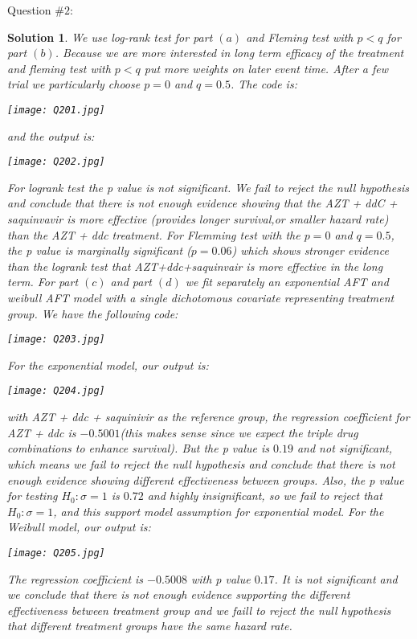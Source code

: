 \documentclass[11pt]{article}
\newtheorem{sol}{Solution}
\begin{document}
Question $\#2$:
\begin{sol}
	We use log-rank test for part $(a)$ and Fleming test with $p <q$ for part $(b)$. Because we are more interested in long term efficacy of the treatment and fleming test with $p <q$ put more weights on later event time. After a few trial we particularly choose $p = 0$ and $q = 0.5$. The code is:
	\begin{center}
		\texttt{[image: Q201.jpg]}
	\end{center}
	and the output is:
	\begin{center}
		\texttt{[image: Q202.jpg]}
	\end{center}
	For logrank test the p value is not significant. We fail to reject the null hypothesis and conclude that there is not enough evidence showing that the AZT + ddC + saquinvavir is more effective (provides longer survival,or smaller hazard rate) than the AZT + ddc treatment.\vskip 2mm
	For Flemming test with the $p = 0$ and $q = 0.5$, the p value is marginally significant ($p = 0.06$) which shows stronger evidence than the logrank test that AZT+ddc+saquinvair is more effective in the long term.\vskip 2mm
	For part $(c)$ and part $(d)$ we fit separately an exponential AFT and weibull AFT model with a single dichotomous covariate representing treatment group. We have the following code:
	\begin{center}
		\texttt{[image: Q203.jpg]}
	\end{center}
	For the exponential model, our output is:
	\begin{center}
		\texttt{[image: Q204.jpg]}
	\end{center}
	with AZT + ddc + saquinivir as the reference group, the regression coefficient for AZT + ddc is $-0.5001$(this makes sense since we expect the triple drug combinations to enhance survival). But the p value is $0.19$ and not significant, which means we fail to reject the null hypothesis and conclude that there is not enough evidence showing different effectiveness between groups. Also, the p value for testing $H_0: \sigma = 1$ is $0.72$ and highly insignificant, so we fail to reject that $H_0: \sigma= 1$, and this support model assumption for exponential model.\vskip 2mm
	For the Weibull model, our output is:
	\begin{center}
		\texttt{[image: Q205.jpg]}
	\end{center}
	The regression coefficient is $-0.5008$ with p value $0.17$. It is not significant and we conclude that there is not enough evidence supporting the different effectiveness between treatment group and we faill to reject the null hypothesis that different treatment groups have the same hazard rate.\vskip 2mm

\end{sol}
\end{document}
